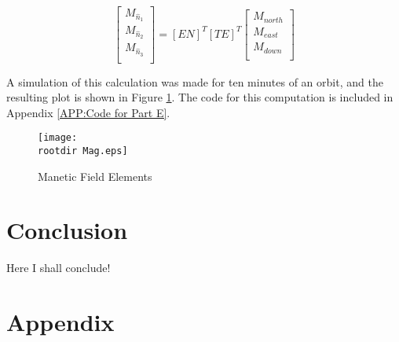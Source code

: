 \documentclass[]{aiaa-tc}%
\newcommand{\brackets} [1] {\left[ #1 \right]}
\newcommand{\rootdir}{./Figures/}
\newcommand{\arrayb}[2]{\brackets{ \begin{array}{#1}  #2 \end{array} } }
\begin{document}
\begin{equation}
	\label{eq:Mag N}
	\arrayb{c}{M_{\hat{n}_1} \\ M_{\hat{n}_2} \\ M_{\hat{n}_3}\\} 
	=
	[EN]^T [TE]^T \arrayb{c}{M_{north} \\ M_{east} \\ M_{down}\\} 
\end{equation}

A simulation of this calculation was made for ten minutes of an orbit, and the resulting plot is shown in Figure \ref{fig:Mag}. The code for this computation is included in Appendix \ref{APP:Code for Part E}.


\begin{centering}
	\begin{figure}[Hh]
		\texttt{[image: \\rootdir Mag.eps]}
		\caption{Manetic Field Elements}
		\label{fig:Mag}
	\end{figure}
\end{centering}









\section{Conclusion}

Here I shall conclude! 

\section{Appendix}
\label{APP:Code}
\end{document}
